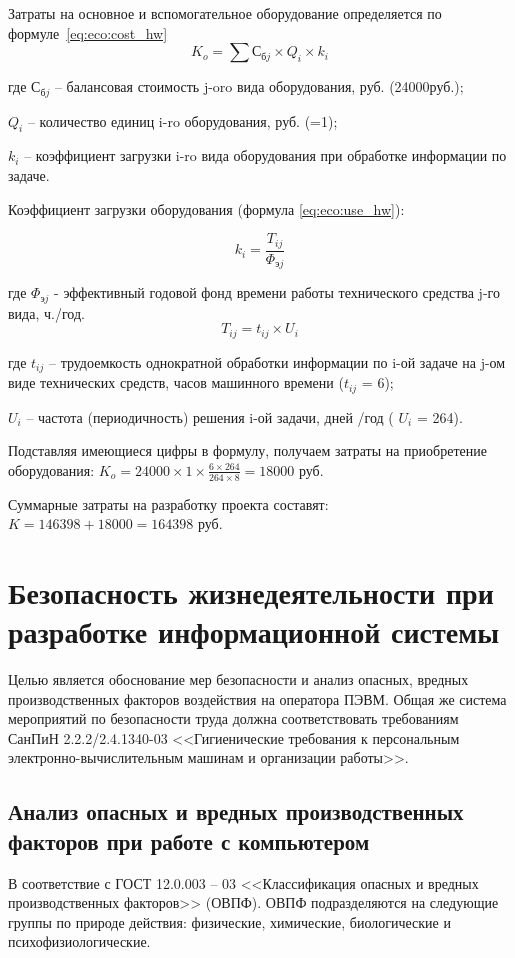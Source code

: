 \documentclass[utf8,usehyperref,12pt]{G7-32}
\begin{document}
Затраты на основное и вспомогательное оборудование определяется по формуле~\ref{eq:eco:cost_hw}
\begin{equation}
  \label{eq:eco:cost_hw}
  K_o = \sum С_{бj} \times Q_i \times k_i
\end{equation}

где $С_{бj}$ – балансовая стоимость j-oro вида оборудования, руб. (24000руб.);

$Q_i$ – количество единиц i-ro оборудования, руб. (=1);

$k_i$ – коэффициент загрузки i-ro вида оборудования при обработке информации по задаче.

Коэффициент загрузки оборудования (формула \ref{eq:eco:use_hw}):

\begin{equation}
  \label{eq:eco:use_hw}
  k_i = \frac{T_{ij}}{\Phi_{эj}}
\end{equation}

где $\Phi_{эj}$ - эффективный годовой фонд времени работы технического средства j-го вида, ч./год.
\begin{equation}
  \label{eq:eco:use_hw_t}
  T_{ij} = t_{ij} \times U_i
\end{equation}

где $t_{ij}$ – трудоемкость однократной обработки информации по i-ой задаче на j-ом виде технических средств, часов машинного времени ($t_{ij}$ = 6);

$U_i$ – частота (периодичность) решения i-ой задачи, дней /год ( $U_i$ = 264).

Подставляя имеющиеся цифры в формулу, получаем затраты на приобретение оборудования:
$K_o = 24000 \times 1 \times \frac{6 \times 264}{264 \times 8} = 18000$ руб.

Суммарные затраты на разработку проекта составят:
$K = 146398 + 18000 = 164398$ руб.

\chapter{Безопасность жизнедеятельности при разработке информационной системы}
Целью является обоснование мер безопасности и анализ опасных, вредных производственных факторов воздействия на оператора ПЭВМ.
Общая же система мероприятий по безопасности труда должна соответствовать требованиям СанПиН 2.2.2/2.4.1340-03 <<Гигиенические требования к персональным электронно-вычислительным машинам и организации работы>>. 

\section{Анализ опасных и вредных производственных факторов при работе с компьютером}
\label{safety_analysis}
В соответствие с ГОСТ 12.0.003 – 03 <<Классификация опасных и вредных производственных факторов>> (ОВПФ). ОВПФ подразделяются на следующие группы по природе действия: физические, химические, биологические и психофизиологические.
\end{document}
